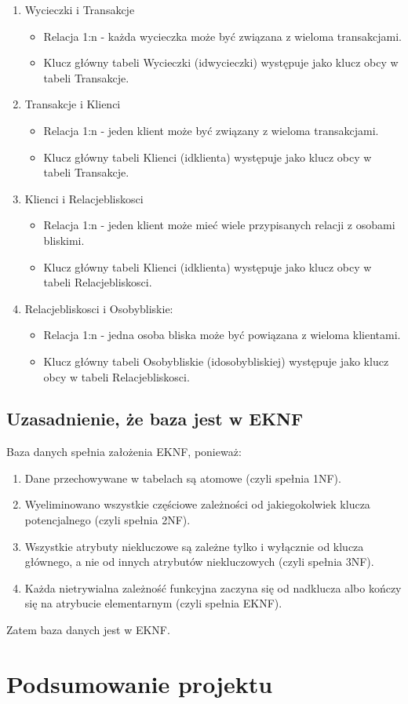 \documentclass{article}
\begin{document}
\begin{enumerate}
		\item Wycieczki i Transakcje
		\begin{itemize}
			\item Relacja 1:n - każda wycieczka może być związana z wieloma transakcjami.
			\item Klucz główny tabeli Wycieczki (id\textunderscore wycieczki) występuje jako klucz obcy w tabeli Transakcje.
		\end{itemize}
		
		\item Transakcje i Klienci
		\begin{itemize}
			\item Relacja 1:n - jeden klient może być związany z wieloma transakcjami.
			\item Klucz główny tabeli Klienci (id\textunderscore klienta) występuje jako klucz obcy w tabeli Transakcje.
		\end{itemize}
		
		\item Klienci i Relacje\textunderscore bliskosci
		\begin{itemize}
			\item Relacja 1:n - jeden klient może mieć wiele przypisanych relacji z osobami bliskimi.
			\item Klucz główny tabeli Klienci (id\textunderscore klienta) występuje jako klucz obcy w tabeli Relacje\textunderscore bliskosci.
		\end{itemize}
		
		\item Relacje\textunderscore bliskosci i Osoby\textunderscore bliskie: 
		\begin{itemize}
			\item Relacja 1:n - jedna osoba bliska może być powiązana z wieloma klientami.
			\item Klucz główny tabeli Osoby\textunderscore bliskie (id\textunderscore osoby\textunderscore bliskiej) występuje jako klucz obcy w tabeli Relacje\textunderscore bliskosci.
		\end{itemize}
		 
	\end{enumerate}
	
	\subsection{Uzasadnienie, że baza jest w EKNF}
	
	Baza danych spełnia założenia EKNF, ponieważ:
	\begin{enumerate}
		\item Dane przechowywane w tabelach są atomowe (czyli spełnia 1NF).
		\item Wyeliminowano wszystkie częściowe zależności od jakiegokolwiek klucza potencjalnego (czyli spełnia 2NF).
		\item Wszystkie atrybuty niekluczowe są zależne tylko i wyłącznie od klucza głównego, a nie od innych atrybutów niekluczowych (czyli spełnia 3NF).
		\item Każda nietrywialna zależność funkcyjna zaczyna się od nadklucza albo kończy się na
		atrybucie elementarnym (czyli spełnia EKNF).
	\end{enumerate}
	
	Zatem baza danych jest w EKNF.
	
	\section{Podsumowanie projektu}
	
\end{document}
